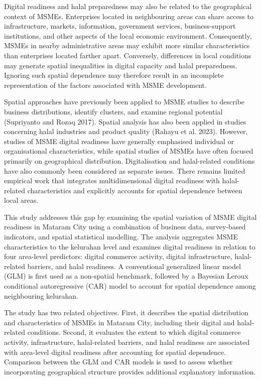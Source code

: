 \documentclass[
  default,
]{sn-jnl}
\begin{document}
Digital readiness and halal preparedness may also be related to the
geographical context of MSMEs. Enterprises located in neighbouring areas
can share access to infrastructure, markets, information, government
services, business-support institutions, and other aspects of the local
economic environment. Consequently, MSMEs in nearby administrative areas
may exhibit more similar characteristics than enterprises located
farther apart. Conversely, differences in local conditions may generate
spatial inequalities in digital capacity and halal preparedness.
Ignoring such spatial dependence may therefore result in an incomplete
representation of the factors associated with MSME development.

Spatial approaches have previously been applied to MSME studies to
describe business distributions, identify clusters, and examine regional
potential (Supriyanto and Rozaq 2017). Spatial analysis has also been
applied in studies concerning halal industries and product quality
(Rahayu et al. 2023). However, studies of MSME digital readiness have
generally emphasised individual or organisational characteristics, while
spatial studies of MSMEs have often focused primarily on geographical
distribution. Digitalisation and halal-related conditions have also
commonly been considered as separate issues. There remains limited
empirical work that integrates multidimensional digital readiness with
halal-related characteristics and explicitly accounts for spatial
dependence between local areas.

This study addresses this gap by examining the spatial variation of MSME
digital readiness in Mataram City using a combination of business data,
survey-based indicators, and spatial statistical modelling. The analysis
aggregates MSME characteristics to the kelurahan level and examines
digital readiness in relation to four area-level predictors: digital
commerce activity, digital infrastructure, halal-related barriers, and
halal readiness. A conventional generalized linear model (GLM) is first
used as a non-spatial benchmark, followed by a Bayesian Leroux
conditional autoregressive (CAR) model to account for spatial dependence
among neighbouring kelurahan.

The study has two related objectives. First, it describes the spatial
distribution and characteristics of MSMEs in Mataram City, including
their digital and halal-related conditions. Second, it evaluates the
extent to which digital commerce activity, infrastructure, halal-related
barriers, and halal readiness are associated with area-level digital
readiness after accounting for spatial dependence. Comparison between
the GLM and CAR models is used to assess whether incorporating
geographical structure provides additional explanatory information.
\end{document}
